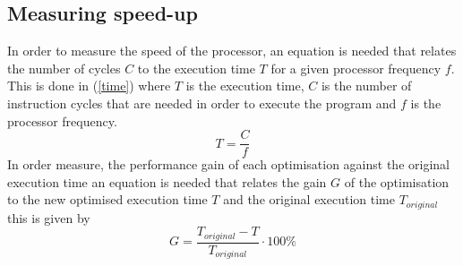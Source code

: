 \documentclass[10pt]{article}
\begin{document}
\clearpage

\subsection{Measuring speed-up}

In order to measure the speed of the processor, an equation is needed that relates the number of cycles $C$ to the execution time $T$ for a given processor frequency $f$. This is done in (\ref{time}) where $T$ is the execution time, $C$ is the number of instruction cycles that are needed in order to execute the program and $f$ is the processor frequency. 
\begin{equation}\label{time}
  T = \frac{C}{f}
\end{equation}
In order measure, the  performance gain of each optimisation against the original execution time an equation is needed that relates the gain $G$ of the optimisation to the new optimised execution time $T$ and the original execution time $T_{original} $ this is given by
\begin{equation}\label{gain}
  G = \frac{T_{original} - T}{T_{original}} \cdot 100 \%
\end{equation}

\end{document}
